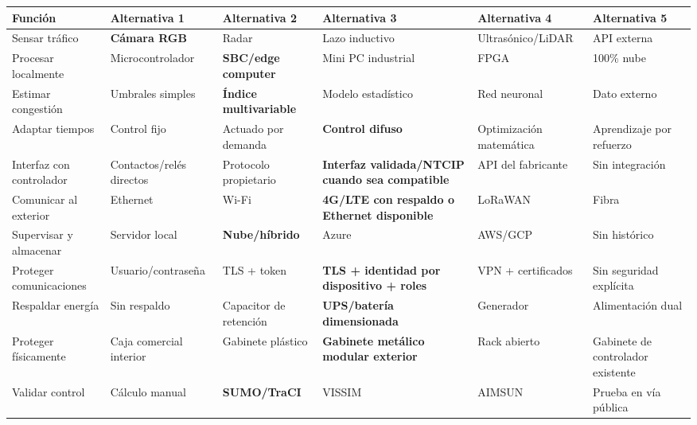 \documentclass[12pt,a4paper,oneside]{report}
\begin{document}
\begin{landscape}
\footnotesize
{}
\label{tbl:matriz-morfologica-v2}
\begin{longtable}{@{}p{4.0cm}p{3.8cm}p{3.8cm}p{3.8cm}p{3.8cm}p{3.8cm}@{}}
\toprule
\textbf{Función} & \textbf{Alternativa 1} & \textbf{Alternativa 2} & \textbf{Alternativa 3} & \textbf{Alternativa 4} & \textbf{Alternativa 5}\\
\midrule
\endhead
Sensar tráfico & \textbf{Cámara RGB} & Radar & Lazo inductivo & Ultrasónico/LiDAR & API externa\\
Procesar localmente & Microcontrolador & \textbf{SBC/edge computer} & Mini PC industrial & FPGA & 100\% nube\\
Estimar congestión & Umbrales simples & \textbf{Índice multivariable} & Modelo estadístico & Red neuronal & Dato externo\\
Adaptar tiempos & Control fijo & Actuado por demanda & \textbf{Control difuso} & Optimización matemática & Aprendizaje por refuerzo\\
Interfaz con controlador & Contactos/relés directos & Protocolo propietario & \textbf{Interfaz validada/NTCIP cuando sea compatible} & API del fabricante & Sin integración\\
Comunicar al exterior & Ethernet & Wi-Fi & \textbf{4G/LTE con respaldo o Ethernet disponible} & LoRaWAN & Fibra\\
Supervisar y almacenar & Servidor local & \textbf{Nube/híbrido} & Azure & AWS/GCP & Sin histórico\\
Proteger comunicaciones & Usuario/contraseña & TLS + token & \textbf{TLS + identidad por dispositivo + roles} & VPN + certificados & Sin seguridad explícita\\
Respaldar energía & Sin respaldo & Capacitor de retención & \textbf{UPS/batería dimensionada} & Generador & Alimentación dual\\
Proteger físicamente & Caja comercial interior & Gabinete plástico & \textbf{Gabinete metálico modular exterior} & Rack abierto & Gabinete de controlador existente\\
Validar control & Cálculo manual & \textbf{SUMO/TraCI} & VISSIM & AIMSUN & Prueba en vía pública\\
\bottomrule
\end{longtable}
\end{landscape}
\end{document}
